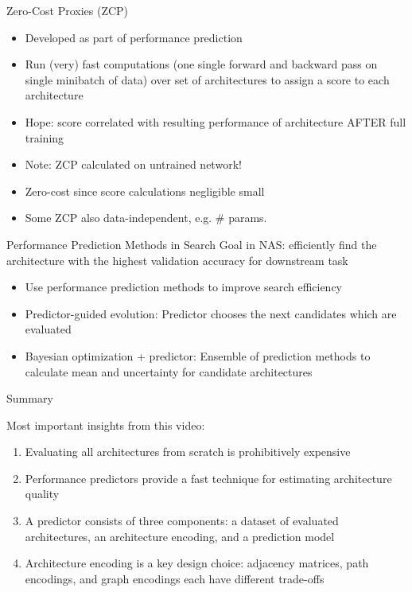 \documentclass[main]{subfiles}
\begin{document}
\begin{frame}{Zero-Cost Proxies (ZCP)}
    \begin{itemize}
        \item Developed as part of performance prediction 
        \item Run (very) fast computations (one single forward and backward pass on single minibatch of data) over set of architectures to assign a score to each architecture
        \item Hope: score correlated with resulting performance of architecture AFTER full training
        \item Note: ZCP calculated on untrained network! 
        \item Zero-cost since score calculations negligible small
        \item Some ZCP also data-independent, e.g. \# params. 
    \end{itemize}
\end{frame}


\begin{frame}{Performance Prediction Methods in Search}
 Goal in NAS: efficiently find the architecture with the highest validation accuracy for downstream task
\begin{itemize}
    \item Use performance prediction methods to improve search efficiency
    \pause
    \item Predictor-guided evolution: Predictor chooses the next candidates which are evaluated
    \pause
    \item Bayesian optimization + predictor: Ensemble of prediction methods to calculate mean and uncertainty for candidate architectures
\end{itemize}

\end{frame}
\fi
\begin{frame}{Summary} 

Most important insights from this video:

\begin{enumerate}
    \item Evaluating all architectures from scratch is prohibitively expensive
    \item Performance predictors provide a fast technique for estimating architecture quality
    \item A predictor consists of three components: a dataset of evaluated architectures, an architecture encoding, and a prediction model 
    \item Architecture encoding is a key design choice: adjacency matrices, path encodings, and graph encodings each have different trade-offs
\end{enumerate}


\end{frame}
\end{document}
